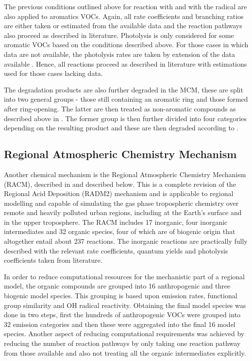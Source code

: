 The previous conditions outlined above for reaction with  and with the  radical are also applied to aromatics VOCs. 
Again, all rate coefficients and branching ratios are either taken or estimated from the available data and the reaction pathways also proceed as described in literature. 
Photolysis is only considered for some aromatic VOCs based on the conditions described above. 
For those cases in which data are not available, the photolysis rates are taken by extension of the data available \citep{Jenkin:2003}. 
Hence, all reactions proceed as described in literature with estimations used for those cases lacking data.

The degradation products are also further degraded in the MCM, these are split into two general groups - those still containing an aromatic ring and those formed after ring-opening. 
The latter are then treated as non-aromatic compounds as described above in \citep{Saunders:2003}. 
The former group is then further divided into four categories depending on the resulting product and these are then degraded according to \citep{Jenkin:2003}.

\subsection{Regional Atmospheric Chemistry Mechanism}
Another chemical mechanism is the Regional Atmospheric Chemistry Mechanism (RACM), described in \citep{Stockwell:1997} and described below. 
This is a complete revision of the Regional Acid Deposition (RADM2) mechanism and is applicable to regional modelling and capable of simulating the gas phase tropospheric chemistry over remote and heavily polluted urban regions, including at the Earth's surface and in the upper troposphere. 
The RACM includes 17 inorganic, four inorganic intermediates and 32 organic species, four of which are of biogenic origin that altogether entail about 237 reactions. 
The inorganic reactions are practically fully described with the relevant rate coefficients, quantum yields and photolysis coefficients taken from literature.

In order to reduce computational resources for the mechanistic part of a regional model, the organic compounds are grouped into 16 anthropogenic and three biogenic model species. 
This grouping is based upon emission rates, functional group similarity and OH radical reactivity. 
Obtaining the final model species was done in two steps, first the hundreds of anthropogenic VOCs were grouped into 32 emission categories and then these were aggregated into the final 16 model species. 
Another aspect of reducing computational requirements was achieved by reducing the number of reaction pathways by only taking one reaction pathway from those available and also not treating all the organic intermediates explicitly.

